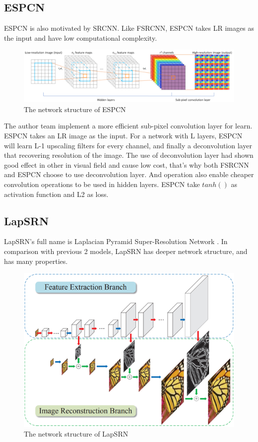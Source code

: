 \documentclass{article}
\begin{document}
  \subsection{ESPCN}
  ESPCN \cite{2} is also motivated by SRCNN. Like FSRCNN, ESPCN takes LR images as the input and have low computational complexity. 
  \begin{figure}[H]
      \centering
      \includegraphics[scale = 0.4]{images/ESPCN.png}
      \caption{The network structure of ESPCN}
  \end{figure}
  The author team implement a more efficient sub-pixel convolution layer for learn. 
  ESPCN takes an LR image as the input. 
  For a network with L layers, ESPCN will learn L-1 upscaling filters for every channel, and finally a deconvolution layer that recovering resolution of the image. 
  The use of deconvolution layer had shown good effect in other in visual field and cause low cost, that's why both FSRCNN and ESPCN choose to use deconvolution layer. 
  And operation also enable cheaper convolution operations to be used in hidden layers.
  ESPCN take $tanh()$ as activation function and L2 as loss.
  
  \subsection{LapSRN}
  LapSRN's full name is Laplacian Pyramid Super-Resolution Network \cite{3}. 
  In comparison with previous 2 models, LapSRN has deeper network structure, and has many properties. 
  \begin{figure}[H]
      \centering
      \includegraphics[scale = 0.4]{images/LapSRN.png}
      \caption{The network structure of LapSRN}
  \end{figure} 
  
\end{document}
